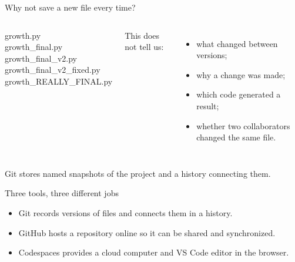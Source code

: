 \documentclass[aspectratio=169,11pt]{beamer}
\begin{document}
\begin{frame}{Why not save a new file every time?}
\begin{columns}[T,onlytextwidth]
  \ttfamily
  growth.py\\
  growth\_final.py\\
  growth\_final\_v2.py\\
  growth\_final\_v2\_fixed.py\\
  growth\_REALLY\_FINAL.py
  \rmfamily

  This does not tell us:
  \begin{itemize}
    \item what changed between versions;
    \item why a change was made;
    \item which code generated a result;
    \item whether two collaborators changed the same file.
  \end{itemize}
\end{columns}

\vspace{0.9em}
Git stores named snapshots of the project and a history connecting them.
\end{frame}

\begin{frame}{Three tools, three different jobs}
\begin{itemize}
  \item Git records versions of files and connects them in a history.
  \item GitHub hosts a repository online so it can be shared and synchronized.
  \item Codespaces provides a cloud computer and VS Code editor in the browser.
\end{itemize}

\vspace{0.9em}
\begin{center}
\end{center}
\end{frame}
\end{document}
